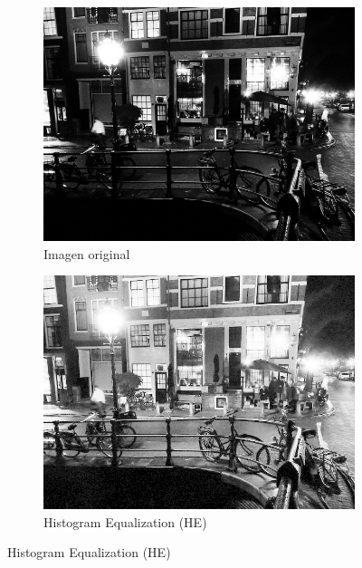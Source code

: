 \documentclass[sigchi]{acmart}
\begin{document}
\begin{figure}[htbp]
	\centering

	\begin{subfigure}[b]{0.28\textwidth}
		\centering
		\includegraphics[width=\linewidth]{./procesadas/2015_00027/2015_00027_original.png}
		\caption{Imagen original}
	\end{subfigure}
	\hfill
	\begin{subfigure}[b]{0.28\textwidth}
		\centering
		\includegraphics[width=\linewidth]{./procesadas/2015_00027/2015_00027_he.png}
		\caption{Histogram Equalization (HE)}
	\end{subfigure}


\end{figure}
\end{document}
